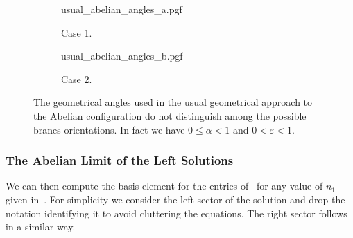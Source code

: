 \begin{figure}[tbp]
  \centering
  \begin{subfigure}[b]{0.45\linewidth}
    \centering
    {usual_abelian_angles_a.pgf}
    \caption{Case 1.}
  \end{subfigure}
  \hfill
  \begin{subfigure}[b]{0.45\linewidth}
    \centering
    {usual_abelian_angles_b.pgf}
    \caption{Case 2.}
  \end{subfigure}
  \caption{%
    The geometrical angles used in the usual geometrical approach to the Abelian configuration do not distinguish among the possible branes orientations.
    In fact we have $0 \le \alpha < 1$ and $0 < \varepsilon < 1$.
  }
  \label{fig:usual_Abelian_angles}
\end{figure}


\subsubsection{The Abelian Limit of the Left Solutions}

We can then compute the basis element for the entries of~ for any value of $n_{1}$ given in~.
For simplicity we consider the left sector of the solution and drop the notation identifying it to avoid cluttering the equations.
The right sector follows in a similar way.

